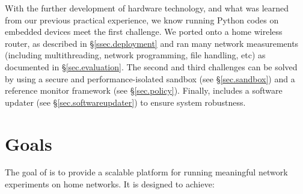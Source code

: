 With the further development of hardware technology, and what was learned from our previous practical experience, we know running Python codes on embedded devices meet the first challenge. We ported \sysname onto a home wireless router, as described in \S{\ref{ssec.deployment}} and ran many network measurements (including multithreading, network programming, file handling, etc) as documented in \S{\ref{sec.evaluation}}. The second and third challenges can be solved by using a secure and performance-isolated sandbox (see \S{\ref{sec.sandbox}}) and a reference monitor framework (see \S{\ref{sec.policy}}). Finally, \sysname includes a software updater (see \S{\ref{sec.softwareupdater}}) to ensure system robustness.

\section{Goals}
\label{ssec.goals}
The goal of \sysname is to provide a scalable platform for running meaningful network experiments on home networks. It is designed to achieve:
